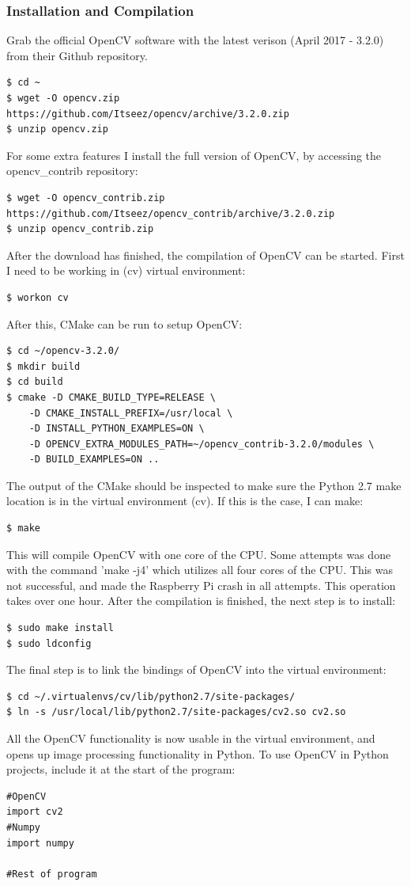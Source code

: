 \subsubsection{Installation and Compilation}
Grab the official OpenCV software with the latest verison (April 2017 - 3.2.0) from their Github repository. 
\begin{verbatim}
$ cd ~
$ wget -O opencv.zip https://github.com/Itseez/opencv/archive/3.2.0.zip
$ unzip opencv.zip
\end{verbatim}
For some extra features I install the full version of OpenCV, by accessing the opencv\_contrib repository:
\begin{verbatim}
$ wget -O opencv_contrib.zip https://github.com/Itseez/opencv_contrib/archive/3.2.0.zip
$ unzip opencv_contrib.zip
\end{verbatim}
After the download has finished, the compilation of OpenCV can be started. First I need to be working in (cv) virtual environment:
\begin{verbatim}
$ workon cv
\end{verbatim}
After this, CMake can be run to setup OpenCV:
\begin{verbatim}
$ cd ~/opencv-3.2.0/
$ mkdir build
$ cd build
$ cmake -D CMAKE_BUILD_TYPE=RELEASE \
    -D CMAKE_INSTALL_PREFIX=/usr/local \
    -D INSTALL_PYTHON_EXAMPLES=ON \
    -D OPENCV_EXTRA_MODULES_PATH=~/opencv_contrib-3.2.0/modules \
    -D BUILD_EXAMPLES=ON ..
\end{verbatim}
The output of the CMake should be inspected to make sure the Python 2.7 make location is in the virtual environment (cv). If this is the case, I can make:
\begin{verbatim}
$ make
\end{verbatim}
This will compile OpenCV with one core of the CPU. Some attempts was done with the command 'make -j4' which utilizes all four cores of the CPU. This was not successful, and made the Raspberry Pi crash in all attempts. This operation takes over one hour. After the compilation is finished, the next step is to install:
\begin{verbatim}
$ sudo make install
$ sudo ldconfig
\end{verbatim}
The final step is to link the bindings of OpenCV into the virtual environment:
\begin{verbatim}
$ cd ~/.virtualenvs/cv/lib/python2.7/site-packages/
$ ln -s /usr/local/lib/python2.7/site-packages/cv2.so cv2.so
\end{verbatim}
All the OpenCV functionality is now usable in the virtual environment, and opens up image processing functionality in Python. To use OpenCV in Python projects, include it at the start of the program:
\begin{verbatim}
#OpenCV
import cv2
#Numpy
import numpy

#Rest of program
\end{verbatim}

